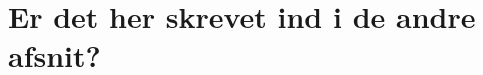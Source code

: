 \section{Er det her skrevet ind i de andre afsnit?}



%
%

\begingroup
	\raggedright
		
		
\endgroup


